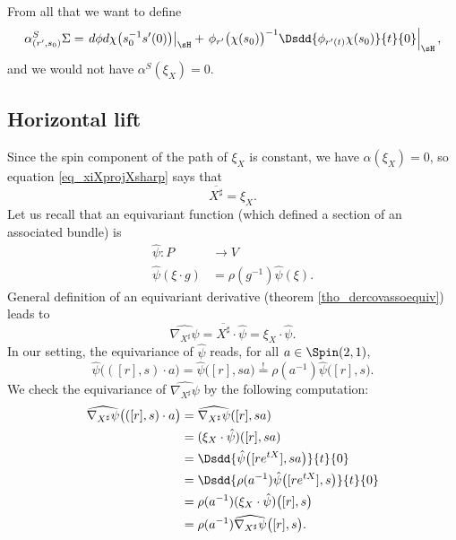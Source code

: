 From all that we want to define
\begin{equation}
   \alpha^{S}_{(r',s_{0})}\Sigma=\left.d\phi d\chi\big(s_{0}^{-1}s'(0)\big)\right|_{\sH}+\left.\phi_{r'}\big( \chi(s_{0}) \big)^{-1}\Dsdd{ \phi_{r'(t)}\chi(s_{0}) }{t}{0}\right|_{\sH},
\end{equation}
and we would not have $\alpha^{S}(\xi_{X})=0$.


\subsection{Horizontal lift}

Since the spin component of the path of $\xi_{X}$ is constant, we have $\alpha(\xi_{X})=0$, so equation  \eqref{eq_xiXprojXsharp} says that
\begin{equation}
\overline{ X^{\sharp} }=\xi_{X}.
\end{equation}
Let us recall that an equivariant function (which defined a section of an associated bundle) is
\begin{equation}
\begin{aligned}
 \hat{\psi}\colon P&\to V \\ 
\hat{\psi}(\xi\cdot g)&= \rho(g^{-1})\hat{\psi}(\xi). 
\end{aligned}
\end{equation}
General definition of an equivariant derivative (theorem \ref{tho_dercovassoequiv}) leads to
\[ 
  \widehat{    \nabla_{X^{\sharp}}\psi    }=\overline{ X^{\sharp} }\cdot\hat{\psi}=\xi_{X} \cdot \hat{\psi}.
\]
In our setting, the equivariance of $\hat{\psi}$ reads, for all $a\in\Spin(2,1)$, 
\[ 
  \hat{\psi}\big( ([r],s)\cdot a \big)=\hat{\psi}\big( [r],sa \big)\stackrel{!}{=}\rho(a^{-1})\hat{\psi}\big( [r],s \big).
\]
We check the equivariance of $\widehat{\nabla_{X^{\sharp}}\psi}$ by the following computation:
\[ 
\begin{split}
\widehat{\nabla_{X^{\sharp}}\psi  }\big( ([r],s)\cdot a \big)&=\widehat{\nabla_{X^{\sharp}}\psi}( [r],sa )\\
        &=(\xi_{X}\cdot \hat{\psi})([r],sa)\\
        &=\Dsdd{ \hat{\psi}\big( [r e^{tX}],sa \big) }{t}{0}\\
        &=\Dsdd{ \rho(a^{-1})\hat{\psi}\big( [r e^{tX}],s \big) }{t}{0}\\
        &=\rho(a^{-1})(\xi_{X}\cdot \hat{\psi})\big( [r],s \big)\\
        &=\rho(a^{-1})\widehat{  \nabla_{X^{\sharp}}\psi  }\big( [r],s \big).
\end{split}  
\]

